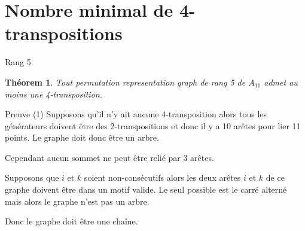 \documentclass[10pt]{beamer}
\newtheorem{theorem}[definition]{Théorem}
\begin{document}
\section{Nombre minimal de 4-transpositions}

\begin{frame}{Rang 5}
  \begin{theorem}
    Tout permutation representation graph de rang 5 de $A_{11}$ admet au moins une 4-transposition.
  \end{theorem}
\end{frame}

\begin{frame}{Preuve (1)}
    Supposons qu'il n'y ait aucune 4-transposition alors tous les générateurs doivent être des 2-transpositions et donc il y a 10 arêtes pour lier 11 points. Le graphe doit donc être un arbre.

    Cependant aucun sommet ne peut être relié par 3 arêtes.

    \begin{figure}[H]
      \begin{center}
      \end{center}
    \end{figure}

    Supposons que $i$ et $k$ soient non-consécutifs alors les deux arêtes $i$ et $k$ de ce graphe doivent être dans un motif valide. Le seul possible est le carré alterné mais alors le graphe n'est pas un arbre.

    Donc le graphe doit être une chaîne.
\end{frame}
\end{document}
